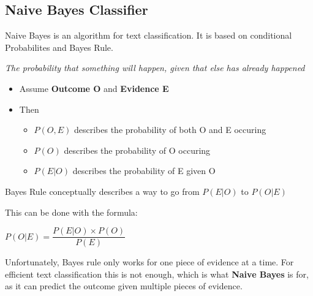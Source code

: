 \documentclass[
../../NLP4W_Summary.tex,
]
{subfiles}
\begin{document}
\subsection{Naive Bayes Classifier}
Naive Bayes is an algorithm for text classification. It is based on conditional Probabilites and Bayes Rule. 

\begin{defbox}
    \textit{The probability that something will happen, given that else has already happened}
    \begin{itemize}
        \item Assume \textbf{Outcome O} and \textbf{Evidence E}
        \item Then 
        \begin{itemize}
            \item $P(O,E)$ describes the probability of both O and E occuring\\
            \rightarrow {}
            \item $P(O)$ describes the probability of O occuring\\ 
            \rightarrow {}
            \item $P(E|O)$ describes the probability of E given O\\
            \rightarrow {}
        \end{itemize}
    \end{itemize}
\end{defbox}

\begin{defbox}
    Bayes Rule conceptually describes a way to go from $P(E|O)$ to $P(O|E)$

    This can be done with the formula:\\
    \begin{center}
        \begin{smallmathbox*}
            $P(O|E) = \dfrac{P(E|O) \times P(O)}{P(E)}$
        \end{smallmathbox*}
    \end{center}
\end{defbox}

Unfortunately, Bayes rule only works for one piece of evidence at a time. For efficient text classification this is not enough, which is what \textbf{Naive Bayes} is for, as it can predict the outcome given multiple pieces of evidence.
\end{document}
